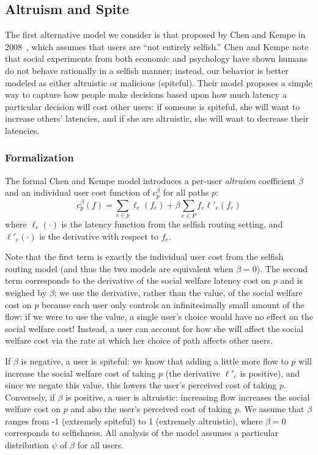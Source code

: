 \subsection{Altruism and Spite}
The first alternative model we consider is that proposed by Chen and Kempe in 2008~\cite{chen}, which assumes that users are ``not entirely selfish.''
Chen and Kempe note that social experiments from both economic and psychology have shown humans do not behave rationally in a selfish manner; instead, our behavior is better modeled as either altruistic or malicious (spiteful).
Their model proposes a simple way to capture how people make decisions based upon how much latency a particular decision will cost other users: if someone is spiteful, she will want to increase others' latencies, and if she are altruistic, she will want to decrease their latencies.

\subsubsection{Formalization}
The formal Chen and Kempe model introduces a per-user \emph{altruism} coefficient $\beta$ and an individual user cost function
of $c^\beta_p$ for all paths $p$:
$$c^\beta_p(f) = \sum_{e \in p} \ell_e(f_e) + \beta\sum_{e\in P} f_e\ell'_e(f_e)$$
where $\ell_e(\cdot)$ is the latency function from the selfish routing setting, and $\ell'_e(\cdot)$ is the derivative with respect to $f_e$.

Note that the first term is exactly the individual user cost from the selfish routing model (and thus the two models are equivalent when $\beta = 0$).
The second term corresponds to the derivative of the social welfare latency cost on $p$ and is weighed by $\beta$; we use the derivative, rather than the value, of the social welfare cost on $p$ because each user only controls an infinitesimally small amount of the flow: if we were to use the value, a single user's choice would have no effect on the social welfare cost! 
Instead, a user can account for how she will affect the social welfare cost via the rate at which her choice of path affects other users.

If $\beta$ is negative, a user is spiteful: we know that adding a little more flow to $p$ will increase the social welfare cost of taking $p$ (the derivative $\ell'_e$ is positive), and since we negate this value, this lowers the user's perceived cost of taking $p$.
Conversely, if $\beta$ is positive, a user is altruistic: increasing flow increases the social welfare cost on $p$ and also the user's perceived cost of taking $p$.
We assume that $\beta$ ranges from -1 (extremely spiteful) to 1 (extremely altruistic), where $\beta=0$ corresponds to selfishness.
All analysis of the model assumes a particular distribution $\psi$ of $\beta$ for all users. 

